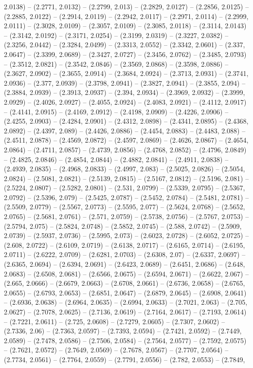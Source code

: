 2.0138) -- (2.2771, 2.0132) -- (2.2799, 2.013) -- (2.2829, 2.0127) -- (2.2856, 2.0125) -- (2.2885, 2.0122) -- (2.2914, 2.0119) -- (2.2942, 2.0117) -- (2.2971, 2.0114) -- (2.2999, 2.0111) -- (2.3028, 2.0109) -- (2.3057, 2.0109) -- (2.3085, 2.0118) -- (2.3114, 2.0143) -- (2.3142, 2.0192) -- (2.3171, 2.0254) -- (2.3199, 2.0319) -- (2.3227, 2.0382) -- (2.3256, 2.0442) -- (2.3284, 2.0499) -- (2.3313, 2.0552) -- (2.3342, 2.0601) -- (2.337, 2.0647) -- (2.3399, 2.0689) -- (2.3427, 2.0727) -- (2.3456, 2.0762) -- (2.3485, 2.0793) -- (2.3512, 2.0821) -- (2.3542, 2.0846) -- (2.3569, 2.0868) -- (2.3598, 2.0886) -- (2.3627, 2.0902) -- (2.3655, 2.0914) -- (2.3684, 2.0924) -- (2.3713, 2.0931) -- (2.3741, 2.0936) -- (2.377, 2.0939) -- (2.3798, 2.0941) -- (2.3827, 2.0941) -- (2.3855, 2.094) -- (2.3884, 2.0939) -- (2.3913, 2.0937) -- (2.394, 2.0934) -- (2.3969, 2.0932) -- (2.3999, 2.0929) -- (2.4026, 2.0927) -- (2.4055, 2.0924) -- (2.4083, 2.0921) -- (2.4112, 2.0917) -- (2.4141, 2.0915) -- (2.4169, 2.0912) -- (2.4198, 2.0909) -- (2.4226, 2.0906) -- (2.4255, 2.0903) -- (2.4284, 2.0901) -- (2.4312, 2.0898) -- (2.4341, 2.0895) -- (2.4368, 2.0892) -- (2.4397, 2.089) -- (2.4426, 2.0886) -- (2.4454, 2.0883) -- (2.4483, 2.088) -- (2.4511, 2.0878) -- (2.4569, 2.0872) -- (2.4597, 2.0869) -- (2.4626, 2.0867) -- (2.4654, 2.0864) -- (2.4711, 2.0857) -- (2.4739, 2.0856) -- (2.4768, 2.0852) -- (2.4796, 2.0849) -- (2.4825, 2.0846) -- (2.4854, 2.0844) -- (2.4882, 2.0841) -- (2.4911, 2.0838) -- (2.4939, 2.0835) -- (2.4968, 2.0833) -- (2.4997, 2.083) -- (2.5025, 2.0826) -- (2.5054, 2.0824) -- (2.5081, 2.0821) -- (2.5139, 2.0815) -- (2.5167, 2.0812) -- (2.5196, 2.081) -- (2.5224, 2.0807) -- (2.5282, 2.0801) -- (2.531, 2.0799) -- (2.5339, 2.0795) -- (2.5367, 2.0792) -- (2.5396, 2.079) -- (2.5425, 2.0787) -- (2.5452, 2.0784) -- (2.5481, 2.0781) -- (2.5509, 2.0779) -- (2.5567, 2.0773) -- (2.5595, 2.077) -- (2.5624, 2.0768) -- (2.5652, 2.0765) -- (2.5681, 2.0761) -- (2.571, 2.0759) -- (2.5738, 2.0756) -- (2.5767, 2.0753) -- (2.5794, 2.075) -- (2.5824, 2.0748) -- (2.5852, 2.0745) -- (2.588, 2.0742) -- (2.5909, 2.0739) -- (2.5937, 2.0736) -- (2.5995, 2.073) -- (2.6023, 2.0728) -- (2.6052, 2.0725) -- (2.608, 2.0722) -- (2.6109, 2.0719) -- (2.6138, 2.0717) -- (2.6165, 2.0714) -- (2.6195, 2.0711) -- (2.6222, 2.0709) -- (2.6281, 2.0703) -- (2.6308, 2.07) -- (2.6337, 2.0697) -- (2.6365, 2.0694) -- (2.6394, 2.0691) -- (2.6423, 2.0689) -- (2.6451, 2.0686) -- (2.648, 2.0683) -- (2.6508, 2.0681) -- (2.6566, 2.0675) -- (2.6594, 2.0671) -- (2.6622, 2.067) -- (2.665, 2.0666) -- (2.6679, 2.0663) -- (2.6708, 2.0661) -- (2.6736, 2.0658) -- (2.6765, 2.0655) -- (2.6793, 2.0653) -- (2.6851, 2.0647) -- (2.6879, 2.0645) -- (2.6908, 2.0641) -- (2.6936, 2.0638) -- (2.6964, 2.0635) -- (2.6994, 2.0633) -- (2.7021, 2.063) -- (2.705, 2.0627) -- (2.7078, 2.0625) -- (2.7136, 2.0619) -- (2.7164, 2.0617) -- (2.7193, 2.0614) -- (2.7221, 2.0611) -- (2.725, 2.0608) -- (2.7279, 2.0605) -- (2.7307, 2.0602) -- (2.7336, 2.06) -- (2.7363, 2.0597) -- (2.7393, 2.0594) -- (2.7421, 2.0592) -- (2.7449, 2.0589) -- (2.7478, 2.0586) -- (2.7506, 2.0584) -- (2.7564, 2.0577) -- (2.7592, 2.0575) -- (2.7621, 2.0572) -- (2.7649, 2.0569) -- (2.7678, 2.0567) -- (2.7707, 2.0564) -- (2.7734, 2.0561) -- (2.7764, 2.0559) -- (2.7791, 2.0556) -- (2.782, 2.0553) -- (2.7849, 